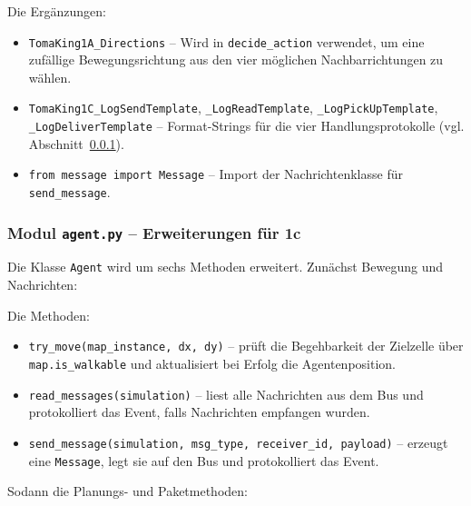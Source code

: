 Die Ergänzungen:
\begin{itemize}
    \item \texttt{TomaKing1A\_Directions} – Wird in \texttt{decide\_action} verwendet, um eine zufällige Bewegungsrichtung aus den vier möglichen Nachbarrichtungen zu wählen.
    \item \texttt{TomaKing1C\_LogSendTemplate}, \texttt{\_LogReadTemplate}, \texttt{\_LogPickUpTemplate}, \\ \texttt{\_LogDeliverTemplate} – Format-Strings für die vier Handlungsprotokolle (vgl. Abschnitt~\ref{sssec:agent_1c_actions}).
    \item \texttt{from message import Message} – Import der Nachrichtenklasse für \texttt{send\_message}.
\end{itemize}


\subsubsection{Modul \texttt{agent.py} – Erweiterungen für 1c}
\label{sssec:agent_1c_actions}

Die Klasse \texttt{Agent} wird um sechs Methoden erweitert. Zunächst Bewegung und Nachrichten:



Die Methoden:
\begin{itemize}
    \item \texttt{try\_move(map\_instance, dx, dy)} – prüft die Begehbarkeit der Zielzelle über \texttt{map.is\_walkable} und aktualisiert bei Erfolg die Agentenposition.
    \item \texttt{read\_messages(simulation)} – liest alle Nachrichten aus dem Bus und protokolliert das Event, falls Nachrichten empfangen wurden.
    \item \texttt{send\_message(simulation, msg\_type, receiver\_id, payload)} – erzeugt eine \texttt{Message}, legt sie auf den Bus und protokolliert das Event.
\end{itemize}

Sodann die Planungs- und Paketmethoden:



